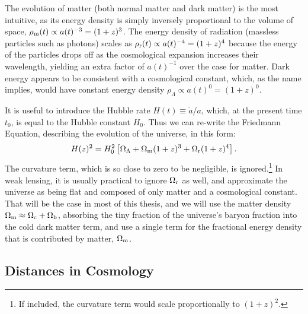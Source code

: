 The evolution of matter (both normal matter and dark matter) is the most intuitive, as its energy density is simply inversely proportional to the volume of space, $\rho_{\rm m}(t) \propto a(t)^{-3} = (1+z)^{3}$. The energy density of radiation (massless particles such as photons) scales as $\rho_{\rm r}(t) \propto a(t)^{-4} = (1+z)^{4}$ because the energy of the particles drops off as the cosmological expansion increases their wavelength, yielding an extra factor of $a(t)^{-1}$ over the case for matter. Dark energy appears to be consistent with a cosmological constant, which, as the name implies, would have constant energy density $\rho_{\Lambda} \propto a(t)^{0} = (1+z)^{0}$.

It is useful to introduce the Hubble rate $H(t) \equiv {\dot a}/a$, which, at the present time $t_0$, is equal to the Hubble constant $H_0$. Thus we can re-write the Friedmann Equation, describing the evolution of the universe, in this form:
\begin{equation}
H(z)^2 = H_0^2 \left[ \Omega_{\Lambda} + \Omega_{\rm m}(1+z)^3 + \Omega_{\rm r} (1+z)^4 \right].
\end{equation}
The curvature term, which is so close to zero to be negligible, is ignored.\footnote{If included, the curvature term would scale proportionally to $(1+z)^2$.} In weak lensing, it is usually practical to ignore $\Omega_{\rm r}$ as well, and approximate the universe as being flat and composed of only matter and a cosmological constant. That will be the case in most of this thesis, and we will use the matter density $\Omega_{\rm m} \approx \Omega_{\rm c} + \Omega_{\rm b}$, absorbing the tiny fraction of the universe's baryon fraction into the cold dark matter term, and use a single term for the fractional energy density that is contributed by matter, $\Omega_{\rm m}$. 



\subsection{Distances in Cosmology}
\label{sec:distances}

